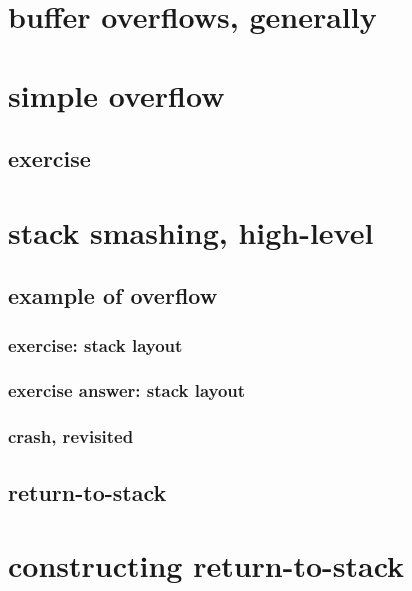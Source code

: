 

\section{buffer overflows, generally}


\section{simple overflow}


\subsection{exercise}



\section{stack smashing, high-level}


\subsection{example of overflow}


\subsubsection{exercise: stack layout}


\subsubsection{exercise answer: stack layout}


\subsubsection{crash, revisited}


\subsection{return-to-stack}


\section{constructing return-to-stack}


